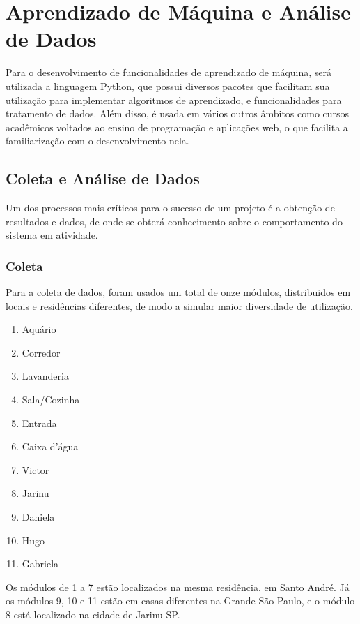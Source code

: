 \chapter{Aprendizado de Máquina e Análise de Dados}

Para o desenvolvimento de funcionalidades de aprendizado de máquina, será utilizada a linguagem Python, que possui diversos pacotes que facilitam sua utilização para implementar algoritmos de aprendizado, e funcionalidades para tratamento de dados. Além disso, é usada em vários outros âmbitos como cursos acadêmicos voltados ao ensino de programação e aplicações web, o que facilita a familiarização com o desenvolvimento nela.

\section{Coleta e Análise de Dados}
Um dos processos mais críticos para o sucesso de um projeto é a obtenção de resultados e dados, de onde se obterá conhecimento sobre o comportamento do sistema em atividade.

\subsection{Coleta}

Para a coleta de dados, foram usados um total de onze módulos, distribuidos em locais e residências diferentes, de modo a simular maior diversidade de utilização.

\begin{enumerate}
	\item Aquário
	\item Corredor
	\item Lavanderia
	\item Sala/Cozinha
	\item Entrada
	\item Caixa d’água
	\item Victor
	\item Jarinu
	\item Daniela
	\item Hugo
	\item Gabriela
\end{enumerate}

Os módulos de 1 a 7 estão localizados na mesma residência, em Santo André. Já os módulos 9, 10 e 11 estão em casas diferentes na Grande São Paulo, e o módulo 8 está localizado na cidade de Jarinu-SP.

